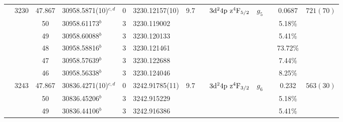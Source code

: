 \begin{table*}
\begin{center}
{\begin{tabular}{:l;l;c;l;c;l;c;l;l;c;c;c;c}
                                  & 3230   & 47.867    & 30958.5871(10)$^{c,d}$           & 0 &    3230.12157(10)  &  9.7 & $                                        $ & $3\rm{d}^24\rm{p~z}^4\rm{F}_{5/2}        $ & $g_{5} $ &              & 0.0687    & $  721(70) $\\
\rowstyle{\itshape}               &        & 50        & 30958.61173$^{b}$                & 3 &   3230.119002      &      & $                                        $ & $                                        $ & $      $ &              & 5.18\%    & $          $\\
\rowstyle{\itshape}               &        & 49        & 30958.60088$^{b}$                & 3 &   3230.120133      &      & $                                        $ & $                                        $ & $      $ &              & 5.41\%    & $          $\\
\rowstyle{\itshape}               &        & 48        & 30958.58816$^{b}$                & 3 &   3230.121461      &      & $                                        $ & $                                        $ & $      $ &              & 73.72\%   & $          $\\
\rowstyle{\itshape}               &        & 47        & 30958.57639$^{b}$                & 3 &   3230.122688      &      & $                                        $ & $                                        $ & $      $ &              & 7.44\%    & $          $\\
\rowstyle{\itshape}               &        & 46        & 30958.56338$^{b}$                & 3 &   3230.124046      &      & $                                        $ & $                                        $ & $      $ &              & 8.25\%    & $          $\\
                                  & 3243   & 47.867    & 30836.4271(10)$^{c,d}$           & 0 &    3242.91785(11)  &  9.7 & $                                        $ & $3\rm{d}^24\rm{p~z}^4\rm{F}_{3/2}        $ & $g_{6} $ &              & 0.232     & $  563(30) $\\
\rowstyle{\itshape}               &        & 50        & 30836.45206$^{b}$                & 3 &   3242.915229      &      & $                                        $ & $                                        $ & $      $ &              & 5.18\%    & $          $\\
\rowstyle{\itshape}               &        & 49        & 30836.44106$^{b}$                & 3 &   3242.916386      &      & $                                        $ & $                                        $ & $      $ &              & 5.41\%    & $          $\\

\end{tabular}}
\end{center}
\end{table*}
